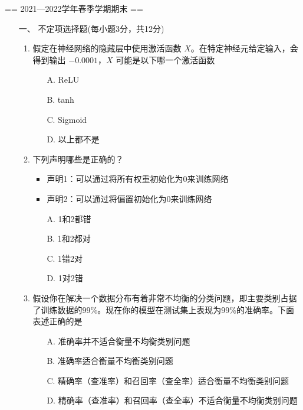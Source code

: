 == 2021—2022学年春季学期期末 ==
\newcommand{\Cov}{\mathbb{C}\mathrm{ov}}
\newcommand{\p}{\mathbb{P}}
\newcommand{\Var}{\mathbb{V}\mathrm{ar}}
\newcommand{\e}{\mathbb{E}}
\def\H{\mathrm{H}}\def\T{\mathrm{T}}

\begin{itemize}
    \item [一、] 不定项选择题(每小题3分，共12分)

\begin{enumerate}
    \item 假定在神经网络的隐藏层中使用激活函数 $X$。在特定神经元给定输入，会得到输出 $-0.0001$，$X$ 可能是以下哪一个激活函数
    \begin{itemize}
        \item[A.] ReLU
        \item[B.] tanh
        \item[C.] Sigmoid
        \item[D.] 以上都不是
    \end{itemize}

    \item 下列声明哪些是正确的？
    \begin{itemize}
        \item 声明1：可以通过将所有权重初始化为0来训练网络
        \item 声明2：可以通过将偏置初始化为0来训练网络
    \end{itemize}
    \begin{itemize}
        \item[A.] 1和2都错
        \item[B.] 1和2都对
        \item[C.] 1错2对
        \item[D.] 1对2错
    \end{itemize}
        \item 假设你在解决一个数据分布有着非常不均衡的分类问题，即主要类别占据了训练数据的99\%。现在你的模型在测试集上表现为99\%的准确率。下面表述正确的是
    \begin{itemize}
        \item[A.] 准确率并不适合衡量不均衡类别问题
        \item[B.] 准确率适合衡量不均衡类别问题
        \item[C.] 精确率（查准率）和召回率（查全率）适合衡量不均衡类别问题
        \item[D.] 精确率（查准率）和召回率（查全率）不适合衡量不均衡类别问题
    \end{itemize}


\end{enumerate}
\end{itemize}
